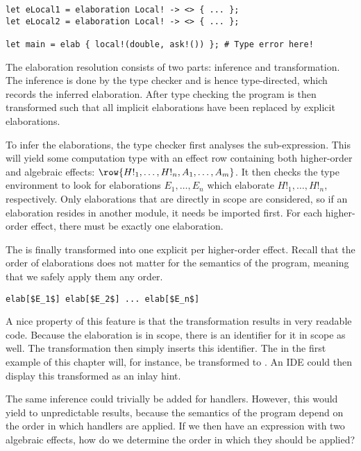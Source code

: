 \begin{lstlisting}[language=elaine,style=fancy]
let eLocal1 = elaboration Local! -> <> { ... };
let eLocal2 = elaboration Local! -> <> { ... };

let main = elab { local!(double, ask!()) }; # Type error here!
\end{lstlisting}

The elaboration resolution consists of two parts: inference and transformation. The inference is done by the type checker and is hence type-directed, which records the inferred elaboration. After type checking the program is then transformed such that all implicit elaborations have been replaced by explicit elaborations.

To infer the elaborations, the type checker first analyses the sub-expression. This will yield some computation type with an effect row containing both higher-order and algebraic effects: $\row{H!_1, \dots, H!_n, A_1, \dots, A_m}$. It then checks the type environment to look for elaborations $E_1, \dots, E_n$ which elaborate $H!_1, \dots, H!_n$, respectively. Only elaborations that are directly in scope are considered, so if an elaboration resides in another module, it needs be imported first. For each higher-order effect, there must be exactly one elaboration.

The  is finally transformed into one explicit  per higher-order effect. Recall that the order of elaborations does not matter for the semantics of the program, meaning that we safely apply them any order.

\begin{lstlisting}[language=elaine,style=fancy]
elab[$E_1$] elab[$E_2$] ... elab[$E_n$]
\end{lstlisting}

A nice property of this feature is that the transformation results in very readable code. Because the elaboration is in scope, there is an identifier for it in scope as well. The transformation then simply inserts this identifier. The \elab in the first example of this chapter will, for instance, be transformed to . An IDE could then display this transformed  as an inlay hint.


The same inference could trivially be added for handlers. However, this would yield to unpredictable results, because the semantics of the program depend on the order in which handlers are applied. If we then have an expression with two algebraic effects, how do we determine the order in which they should be applied?

